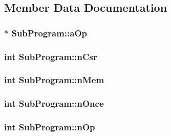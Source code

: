 \subsection{Member Data Documentation}
\hypertarget{struct_sub_program_aa9bb1992fed633d182076a35d6448c7d}{
\subsubsection[{a\-Op}]{$\ast$ Sub\-Program\-::a\-Op}}\label{struct_sub_program_aa9bb1992fed633d182076a35d6448c7d}
\hypertarget{struct_sub_program_a83b18aa5cc63aecdbf996c16af1e48bb}{
\subsubsection[{n\-Csr}]{\setlength{\rightskip}{0pt plus 5cm}int Sub\-Program\-::n\-Csr}}\label{struct_sub_program_a83b18aa5cc63aecdbf996c16af1e48bb}
\hypertarget{struct_sub_program_a9bece42fdeb81085809d7c2f8aa05616}{
\subsubsection[{n\-Mem}]{\setlength{\rightskip}{0pt plus 5cm}int Sub\-Program\-::n\-Mem}}\label{struct_sub_program_a9bece42fdeb81085809d7c2f8aa05616}
\hypertarget{struct_sub_program_a907d5933dd0149be1ef90fcbe91e3c58}{
\subsubsection[{n\-Once}]{\setlength{\rightskip}{0pt plus 5cm}int Sub\-Program\-::n\-Once}}\label{struct_sub_program_a907d5933dd0149be1ef90fcbe91e3c58}
\hypertarget{struct_sub_program_a6fe204a75ab8254c453be77f024b6d69}{
\subsubsection[{n\-Op}]{\setlength{\rightskip}{0pt plus 5cm}int Sub\-Program\-::n\-Op}}\label{struct_sub_program_a6fe204a75ab8254c453be77f024b6d69}

